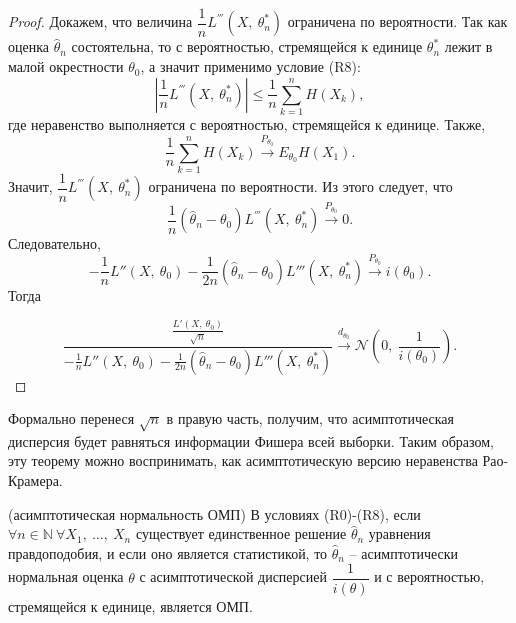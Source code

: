 \begin{proof}
    Докажем, что величина $\displaystyle \dfrac{1}{n} L^{'''}\left( X,\ \theta _{n}^{*}\right)$ ограничена по вероятности. Так как оценка $\displaystyle \hat{\theta }_{n}$ состоятельна, то с вероятностью, стремящейся к единице $\displaystyle \theta _{n}^{*}$ лежит в малой окрестности $\displaystyle \theta _{0}$, а значит применимо условие (R8):
    \begin{equation*}
        \left| \dfrac{1}{n} L^{'''}\left( X,\ \theta _{n}^{*}\right)\right| \leq \dfrac{1}{n}\sum _{k=1}^{n} H( X_{k}) ,
    \end{equation*}
    где неравенство выполняется с вероятностью, стремящейся к единице. Также,
    \begin{equation*}
        \dfrac{1}{n}\sum _{k=1}^{n} H( X_{k})\xrightarrow{P_{\theta _{0}}} E_{\theta _{0}} H( X_{1}) .
    \end{equation*}
    Значит, $\displaystyle \dfrac{1}{n} L^{'''}\left( X,\ \theta _{n}^{*}\right)$ ограничена по вероятности. Из этого следует, что
    \begin{equation*}
        \frac{1}{n}(\hat{\theta }_{n} -\theta _{0}) L^{'''}\left( X,\ \theta _{n}^{*}\right)\xrightarrow{P_{\theta _{0}}} 0.
    \end{equation*}
    Следовательно,
    \begin{equation*}
        -\frac{1}{n} L''( X,\ \theta _{0}) -\frac{1}{2n}(\hat{\theta }_{n} -\theta _{0}) L'''\left( X,\ \theta _{n}^{*}\right)\xrightarrow{P_{\theta _{0}}} i( \theta _{0}) .
    \end{equation*}
    Тогда
    
    \begin{equation*}
        \dfrac{\frac{L'( X,\ \theta _{0})}{\sqrt{n}}}{-\frac{1}{n} L''( X,\ \theta _{0}) -\frac{1}{2n}(\hat{\theta }_{n} -\theta _{0}) L'''\left( X,\ \theta _{n}^{*}\right)}\xrightarrow{d_{\theta _{0}}}\mathcal{N}\left( 0,\ \dfrac{1}{i( \theta _{0})}\right) .
    \end{equation*}
\end{proof}
\begin{note}
    Формально перенеся $\displaystyle \sqrt{n}$ в правую часть, получим, что асимптотическая дисперсия будет равняться информации Фишера всей выборки. Таким образом, эту теорему можно воспринимать, как асимптотическую версию неравенства Рао-Крамера.
\end{note}
\begin{corollary}
    (асимптотическая нормальность ОМП) В условиях (R0)-(R8), если $\displaystyle \forall n\in \mathbb{N} \ \forall X_{1} ,\ \dotsc ,\ X_{n}$ существует единственное решение $\displaystyle \hat{\theta }_{n}$ уравнения правдоподобия, и если оно является статистикой, то $\displaystyle \hat{\theta }_{n}$ -- асимптотически нормальная оценка $\displaystyle \theta $ с асимптотической дисперсией $\displaystyle \dfrac{1}{i( \theta )}$ и с вероятностью, стремящейся к единице, является ОМП. 
\end{corollary}

